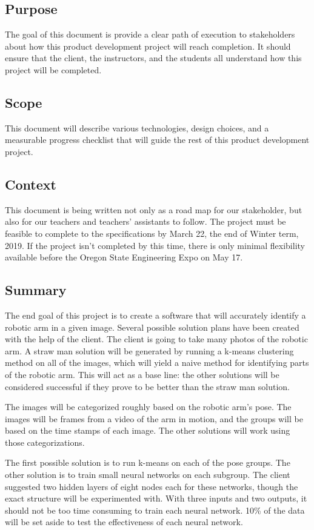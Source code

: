 \documentclass[10pt,journal,compsoc, draftclsnofoot,onecolumn]{IEEEtran}
\begin{document}
\subsection{Purpose}
The goal of this document is provide a clear path of execution to stakeholders about how this product development project will reach completion.
It should ensure that the client, the instructors, and the students all understand how this project will be completed.

\subsection{Scope}
This document will describe various technologies, design choices, and a measurable progress checklist that will guide the rest of this product development project.

\subsection{Context}
This document is being written not only as a road map for our stakeholder, but also for our teachers and teachers' assistants to follow.
The project must be feasible to complete to the specifications by March 22, the end of Winter term, 2019.
If the project isn't completed by this time, there is only minimal flexibility available before the Oregon State Engineering Expo on May 17.

\subsection{Summary}
The end goal of this project is to create a software that will accurately identify a robotic arm in a given image.
Several possible solution plans have been created with the help of the client.
The client is going to take many photos of the robotic arm.
A straw man solution will be generated by running a k-means clustering method on all of the images, which will yield a naive method for identifying parts of the robotic arm.
This will act as a base line: the other solutions will be considered successful if they prove to be better than the straw man solution.

The images will be categorized roughly based on the robotic arm's pose.
The images will be frames from a video of the arm in motion, and the groups will be based on the time stamps of each image.
The other solutions will work using those categorizations.

The first possible solution is to run k-means on each of the pose groups.
The other solution is to train small neural networks on each subgroup. The client suggested two hidden layers of eight nodes each for these networks, though the exact structure will be experimented with.
With three inputs and two outputs, it should not be too time consuming to train each neural network.
10\% of the data will be set aside to test the effectiveness of each neural network.
\end{document}
